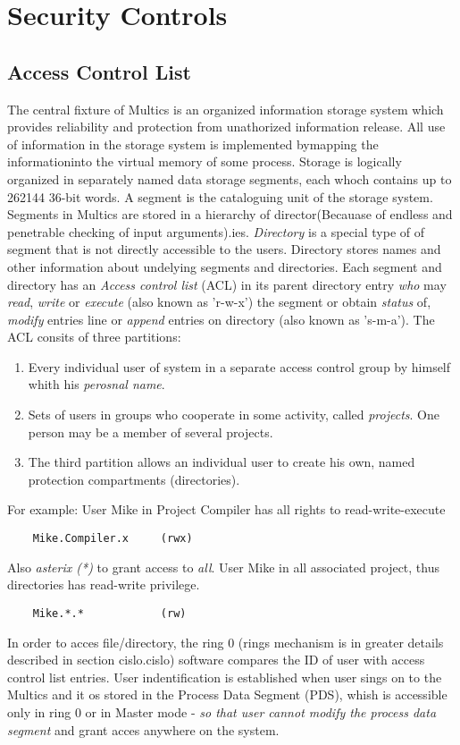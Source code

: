 \section{Security Controls}


\subsection{Access Control List}

The central fixture of Multics is an organized information storage system which provides reliability and 
protection from unathorized information release. All use of information in the storage system is implemented 
bymapping the informationinto the virtual memory of some process. Storage is logically organized in separately 
named data storage segments, each whoch contains up to 262144 36-bit words. A segment is the cataloguing unit of 
the storage system.
Segments in Multics are stored in a hierarchy of director(Becauase of endless and penetrable checking of input arguments).ies. \textit{Directory} is a special type of of
segment that is not directly accessible to the users.
Directory stores names and other information about undelying segments and directories.
Each segment and directory has an \textit{Access control list} (ACL) in its parent directory entry
\textit{who} may \textit{read}, \textit{write} or \textit{execute} (also known as 'r-w-x') the segment or obtain 
\textit{status} of, \textit{modify} entries line or \textit{append} entries on directory (also known as 's-m-a').
The ACL consits of three partitions:
\begin{enumerate}
    \item Every individual user of system in a separate access control group by himself whith his \textit{perosnal name}.
    \item Sets of users in groups who cooperate in some activity, called \textit{projects}. One person may be a member of 
    several projects.
    \item  The third partition allows an individual user to create his own, named protection compartments (directories).
\end{enumerate}

For example:
User Mike in Project Compiler has all rights to read-write-execute
\begin{lstlisting}
    Mike.Compiler.x     (rwx)
\end{lstlisting}

Also \textit{asterix (*)} to grant access to \textit{all}.
User Mike in all associated project, thus directories has read-write privilege.
\begin{lstlisting}
    Mike.*.*            (rw)
\end{lstlisting}
In order to acces file/directory, the ring 0 (rings mechanism is in greater details described in section cislo.cislo) 
software compares the ID of user with access control list entries.
User indentification is established when user sings on to the Multics and it os stored in the Process Data 
Segment (PDS), whish is accessible only in ring 0 or in Master mode - \textit{so that user cannot modify the
process data segment} and grant acces anywhere on the system.


